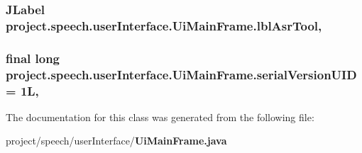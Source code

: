 \subsubsection[{lbl\+Asr\+Tool}]{\setlength{\rightskip}{0pt plus 5cm}J\+Label project.\+speech.\+user\+Interface.\+Ui\+Main\+Frame.\+lbl\+Asr\+Tool\hspace{0.3cm}{\ttfamily [static]}, {\ttfamily [private]}}\label{classproject_1_1speech_1_1user_interface_1_1_ui_main_frame_a582d52a29f63166c169a8dc8796d52ed}
\subsubsection[{serial\+Version\+U\+I\+D}]{\setlength{\rightskip}{0pt plus 5cm}final long project.\+speech.\+user\+Interface.\+Ui\+Main\+Frame.\+serial\+Version\+U\+I\+D = 1\+L\hspace{0.3cm}{\ttfamily [static]}, {\ttfamily [private]}}\label{classproject_1_1speech_1_1user_interface_1_1_ui_main_frame_a2ba293118fadf5f21e124e52fe5f1de0}


The documentation for this class was generated from the following file\+:\begin{DoxyCompactItemize}
\item 
project/speech/user\+Interface/{\bf Ui\+Main\+Frame.\+java}\end{DoxyCompactItemize}
